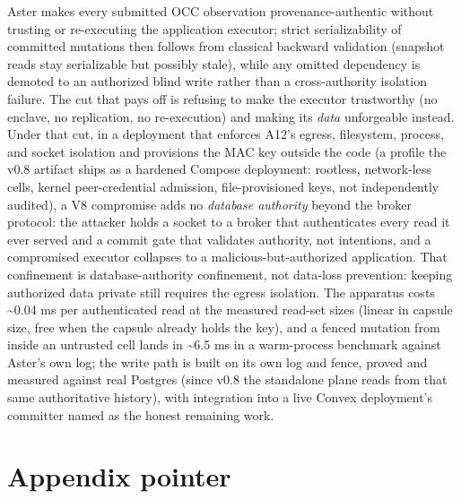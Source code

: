 \documentclass[
  11pt,
]{article}
\begin{document}
Aster makes every submitted OCC observation provenance-authentic without trusting or re-executing the application executor; strict serializability of committed mutations then follows from classical backward validation (snapshot reads stay serializable but possibly stale), while any omitted dependency is demoted to an authorized blind write rather than a cross-authority isolation failure. The cut that pays off is refusing to make the executor trustworthy (no enclave, no replication, no re-execution) and making its \emph{data} unforgeable instead. Under that cut, in a deployment that enforces A12's egress, filesystem, process, and socket isolation and provisions the MAC key outside the code (a profile the v0.8 artifact ships as a hardened Compose deployment: rootless, network-less cells, kernel peer-credential admission, file-provisioned keys, not independently audited), a V8 compromise adds no \emph{database authority} beyond the broker protocol: the attacker holds a socket to a broker that authenticates every read it ever served and a commit gate that validates authority, not intentions, and a compromised executor collapses to a malicious-but-authorized application. That confinement is database-authority confinement, not data-loss prevention: keeping authorized data private still requires the egress isolation. The apparatus costs \textasciitilde0.04 ms per authenticated read at the measured read-set sizes (linear in capsule size, free when the capsule already holds the key), and a fenced mutation from inside an untrusted cell lands in \textasciitilde6.5 ms in a warm-process benchmark against Aster's own log; the write path is built on its own log and fence, proved and measured against real Postgres (since v0.8 the standalone plane reads from that same authoritative history), with integration into a live Convex deployment's committer named as the honest remaining work.

\section*{Appendix pointer}
\end{document}
